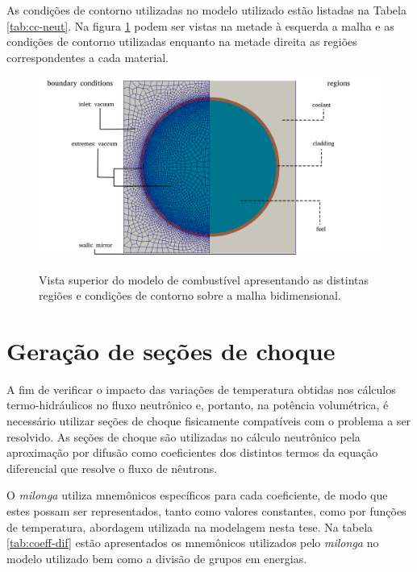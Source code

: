 As condições de contorno utilizadas no modelo utilizado estão listadas na Tabela
\ref{tab:cc-neut}. Na figura \ref{fig:cc-neut} podem ser vistas na metade à esquerda
a malha e as condições de contorno utilizadas enquanto na metade direita as
regiões correspondentes a cada material.


\begin{figure}[htb]
  \caption{Vista superior do modelo de combustível apresentando as distintas regiões e condições de contorno
    sobre a malha bidimensional.}
  \centering\includegraphics[scale=0.52]{figuras/regions_neutronica_malha_e_sem.png}
  \label{fig:cc-neut}
\end{figure}


\section{Geração de seções de choque}
\label{sec:gerxs}

A fim de verificar o impacto das variações de temperatura obtidas nos cálculos
termo-hidráulicos no fluxo
neutrônico e, portanto, na potência volumétrica, é necessário utilizar seções de choque
fisicamente compatíveis com o problema a ser resolvido. As seções de choque são utilizadas no cálculo neutrônico
pela aproximação por difusão como coeficientes dos distintos termos da equação
diferencial que resolve o fluxo de nêutrons.

O \textit{milonga} utiliza mnemônicos específicos para cada coeficiente, de modo
que estes possam ser representados, tanto como valores constantes, como por funções
de temperatura, abordagem utilizada na modelagem nesta tese. Na tabela
\ref{tab:coeff-dif} estão apresentados os mnemônicos utilizados pelo \textit{milonga}
no modelo utilizado bem como a divisão de grupos em energias.

